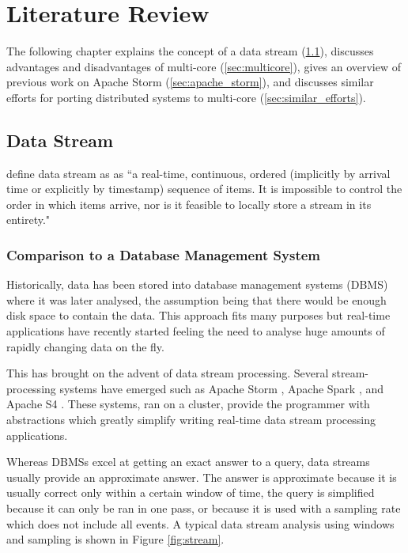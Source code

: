 \chapter{Literature Review}

The following chapter explains the concept of a data stream (\ref{sec:data_stream}), discusses advantages and disadvantages of multi-core (\ref{sec:multicore}), gives an overview of previous work on Apache Storm (\ref{sec:apache_storm}), and discusses similar efforts for porting distributed systems to multi-core (\ref{sec:similar_efforts}).

\section{Data Stream}
\label{sec:data_stream}

\textcite{golab2003issues} define data stream as as ``a real-time, continuous, ordered (implicitly by arrival time or explicitly by timestamp) sequence of items. It is impossible to control the order in which items arrive, nor is it feasible to locally store a stream in its entirety."


\subsection{Comparison to a Database Management System}

Historically, data has been stored into database management systems (DBMS) where it was later analysed, the assumption being that there would be enough disk space to contain the data. This approach fits many purposes but real-time applications have recently started feeling the need to analyse huge amounts of rapidly changing data on the fly.

This has brought on the advent of data stream processing. Several stream-processing systems have emerged such as Apache Storm \citep{ApacheStorm}, Apache Spark \citep{ApacheSpark}, and Apache S4 \citep{YahooS4}. These systems, ran on a cluster, provide the programmer with abstractions which greatly simplify writing real-time data stream processing applications.

Whereas DBMSs excel at getting an exact answer to a query, data streams usually provide an approximate answer. The answer is approximate because it is usually correct only within a certain window of time, the query is simplified because it can only be ran in one pass, or because it is used with a sampling rate which does not include all events. A typical data stream analysis using windows and sampling is shown in Figure \ref{fig:stream}.


